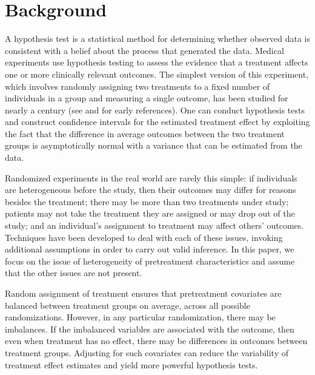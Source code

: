 \documentclass[11pt]{article}
\begin{document}

%
%


\section*{Background}
A hypothesis test is a statistical method for determining whether observed data is consistent with a belief about the process that generated the data.
Medical experiments use hypothesis testing to assess the evidence that a treatment affects one or more clinically relevant outcomes.
The simplest version of this experiment, which involves randomly assigning two treatments to a fixed number of individuals in a group and measuring a single outcome, has been studied for nearly a century (see \cite{fisher_design_1935} and \cite{neyman_application_1923} for early references).
One can conduct hypothesis tests and construct confidence intervals for the estimated treatment effect
by exploiting the fact that the difference in average outcomes between the two treatment groups is asymptotically normal with a variance that can be estimated from the data.

Randomized experiments in the real world are rarely this simple:
if individuals are heterogeneous before the study, then their outcomes may differ for reasons besides the treatment;
there may be more than two treatments under study;
patients may not take the treatment they are assigned or may drop out of the study;
and an individual's assignment to treatment may affect others' outcomes.
Techniques have been developed to deal with each of these issues, invoking additional assumptions in order to carry out valid inference.
In this paper, we focus on the issue of heterogeneity of pretreatment characteristics and assume that the other issues are not present.

Random assignment of treatment ensures that pretreatment covariates are balanced between treatment groups on average, across all possible randomizations.
However, in any particular randomization, there may be imbalances.
If the imbalanced variables are associated with the outcome, then even when treatment has no effect, there may be differences in outcomes between treatment groups.
Adjusting for such covariates can reduce the variability of treatment effect estimates and yield more powerful hypothesis tests.
\end{document}
